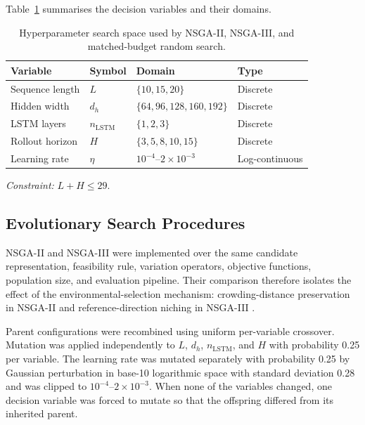 \documentclass[a4paper,fleqn]{cas-sc}
\begin{document}
Table~\ref{tab:search_space} summarises the decision variables and their domains.

\begin{table}[htbp]
\centering
\caption{Hyperparameter search space used by NSGA-II, NSGA-III, and matched-budget random search.}
\label{tab:search_space}
\begin{tabular}{llll}
\toprule
\textbf{Variable} &
\textbf{Symbol} &
\textbf{Domain} &
\textbf{Type} \\
\midrule
Sequence length &
$L$ &
$\{10,15,20\}$ &
Discrete \\

Hidden width &
$d_h$ &
$\{64,96,128,160,192\}$ &
Discrete \\

LSTM layers &
$n_{\mathrm{LSTM}}$ &
$\{1,2,3\}$ &
Discrete \\

Rollout horizon &
$H$ &
$\{3,5,8,10,15\}$ &
Discrete \\

Learning rate &
$\eta$ &
$10^{-4}$--$2\times10^{-3}$ &
Log-continuous \\
\bottomrule
\end{tabular}

\vspace{2mm}
\footnotesize{\textit{Constraint:} $L+H\leq29$.}
\end{table}




\subsection{Evolutionary Search Procedures}
\label{sec:evolutionary_search}

NSGA-II and NSGA-III were implemented over the same candidate representation, feasibility rule, variation operators, objective functions, population size, and evaluation pipeline. Their comparison therefore isolates the effect of the environmental-selection mechanism: crowding-distance preservation in NSGA-II and reference-direction niching in NSGA-III \cite{deb2002nsga2,deb2014nsga3}.

Parent configurations were recombined using uniform per-variable crossover. Mutation was applied independently to $L$, $d_h$, $n_{\mathrm{LSTM}}$, and $H$ with probability 0.25 per variable. The learning rate was mutated separately with probability 0.25 by Gaussian perturbation in base-10 logarithmic space with standard deviation 0.28 and was clipped to $10^{-4}$--$2\times10^{-3}$. When none of the variables changed, one decision variable was forced to mutate so that the offspring differed from its inherited parent.
\end{document}
